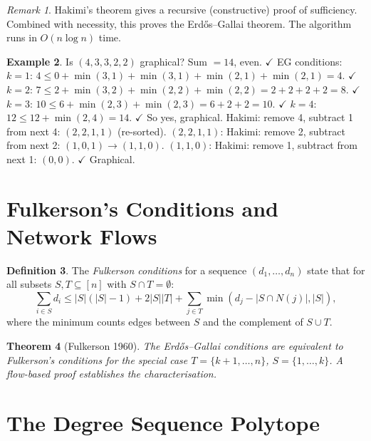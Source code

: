 \documentclass[12pt,a4paper]{amsart}
\newtheorem{theorem}{Theorem}[section]
\theoremstyle{definition}
\newtheorem{definition}[theorem]{Definition}
\newtheorem{example}[theorem]{Example}
\theoremstyle{remark}
\newtheorem{remark}[theorem]{Remark}
\begin{document}
\begin{remark}
Hakimi's theorem gives a recursive (constructive) proof of sufficiency.
Combined with necessity, this proves the Erd\H{o}s--Gallai theorem.
The algorithm runs in $O(n \log n)$ time.
\end{remark}

\begin{example}
Is $(4, 3, 3, 2, 2)$ graphical?
Sum $= 14$, even. $\checkmark$
EG conditions: $k=1$: $4 \leq 0 + \min(3,1)+\min(3,1)+\min(2,1)+\min(2,1) = 4$. $\checkmark$
$k=2$: $7 \leq 2 + \min(3,2)+\min(2,2)+\min(2,2) = 2+2+2+2 = 8$. $\checkmark$
$k=3$: $10 \leq 6 + \min(2,3)+\min(2,3) = 6+2+2=10$. $\checkmark$
$k=4$: $12 \leq 12 + \min(2,4) = 14$. $\checkmark$
So yes, graphical. Hakimi: remove 4, subtract 1 from next 4: $(2,2,1,1)$ (re-sorted).
$(2,2,1,1)$: Hakimi: remove 2, subtract from next 2: $(1,0,1) \to (1,1,0)$.
$(1,1,0)$: Hakimi: remove 1, subtract from next 1: $(0,0)$. $\checkmark$ Graphical.
\end{example}

\section{Fulkerson's Conditions and Network Flows}

\begin{definition}
The \emph{Fulkerson conditions} for a sequence $(d_1, \ldots, d_n)$ state
that for all subsets $S, T \subseteq [n]$ with $S \cap T = \emptyset$:
\[
  \sum_{i \in S} d_i \leq |S|(|S|-1) + 2|S||T| + \sum_{j \in T}
  \min(d_j - |S \cap N(j)|, |S|),
\]
where the minimum counts edges between $S$ and the complement of $S \cup T$.
\end{definition}

\begin{theorem}[Fulkerson 1960]
The Erd\H{o}s--Gallai conditions are equivalent to Fulkerson's conditions for
the special case $T = \{k+1, \ldots, n\}$, $S = \{1, \ldots, k\}$.
A flow-based proof establishes the characterisation.
\end{theorem}

\section{The Degree Sequence Polytope}
\end{document}
